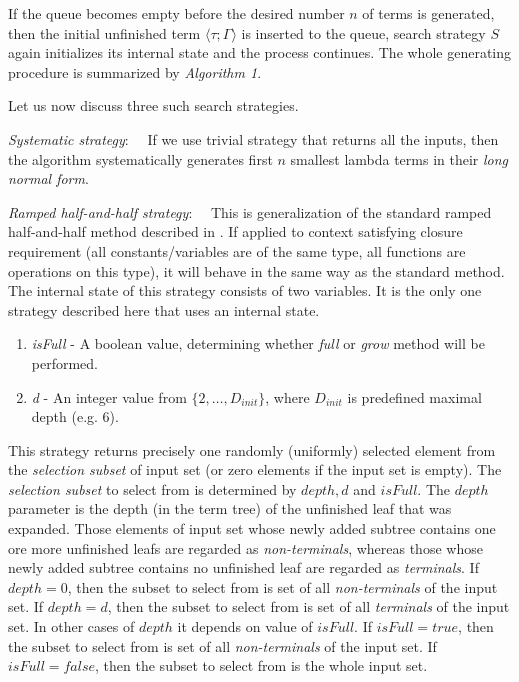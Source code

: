 \documentclass[conference]{IEEEtran}
\newcommand{\Lets}{Let us\xspace}
\newcommand{\setDots}[2]{ \lbrace #1 , \dots , #2 \rbrace}
\newcommand{\ul}[2]{\langle #1 ; #2 \rangle}
\begin{document}
If the queue becomes empty before the desired number $n$ of terms
is generated, then the initial unfinished term $\ul{\tau}{\Gamma}$ 
is inserted to the queue, search strategy $S$
again initializes its internal state and the process continues.
The whole generating procedure is summarized by \textit{Algorithm 1}.

\Lets now discuss three such search strategies.


\textit{Systematic strategy}:~~ 
If we use trivial strategy that returns all the inputs, 
then the algorithm systematically generates 
first $n$ smallest lambda terms in their
\textit{long normal form}.


\textit{Ramped half-and-half strategy}:~~
This is generalization of the standard ramped half-and-half method described 
in \cite{koza92}. If applied to context satisfying closure requirement
(all constants/variables are of the same type, all functions are operations
on this type), it will behave in the same way as the standard method.
The internal state of this strategy consists of two variables.
It is the only one strategy described here that uses an internal state.

\begin{enumerate}
 \item \textit{isFull} - A boolean value, determining whether \textit{full}
                     or \textit{grow} method will be performed.
 \item \textit{d} - An integer value from $\setDots{2}{D_{init}}$, where 
                $D_{init}$ is predefined maximal depth (e.g. 6).                    
\end{enumerate}

This strategy returns precisely one randomly
(uniformly) selected  element from 
the \textit{selection subset} of input set
(or zero elements if the input set is empty). 
The \textit{selection subset} 
to select from is determined by $depth, d$ and $isFull$.
The $depth$ parameter is the depth (in the term tree) 
of the unfinished leaf that was expanded.
Those elements of input set whose newly added subtree contains one ore more 
unfinished leafs are regarded as \textit{non-terminals}, whereas 
those whose newly added subtree contains no unfinished leaf are regarded as 
\textit{terminals}.
If $depth = 0$, then the subset to select from is  
set of all \textit{non-terminals} of the input set.
If $depth = d$, then the subset to select from is
set of all \textit{terminals} of the input set.
In other cases of $depth$ it depends on value of $isFull$.
If $isFull = true$, then the subset to select from is 
set of all \textit{non-terminals} of the input set.
If $isFull = false$, then the subset to select from is 
the whole input set.
\end{document}
